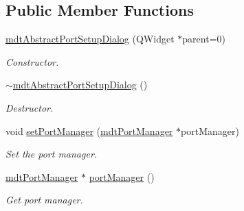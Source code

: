 \subsection*{Public Member Functions}
\begin{DoxyCompactItemize}
\item 
\hypertarget{classmdt_abstract_port_setup_dialog_a3f62d7eb0c8bdc3bbc7874b975ee7fd2}{
\hyperlink{classmdt_abstract_port_setup_dialog_a3f62d7eb0c8bdc3bbc7874b975ee7fd2}{mdtAbstractPortSetupDialog} (QWidget $\ast$parent=0)}
\label{classmdt_abstract_port_setup_dialog_a3f62d7eb0c8bdc3bbc7874b975ee7fd2}

\begin{DoxyCompactList}\small\item\em Constructor. \end{DoxyCompactList}\item 
\hypertarget{classmdt_abstract_port_setup_dialog_ad4df603a6fa5277757cdceef2bf9e4df}{
\hyperlink{classmdt_abstract_port_setup_dialog_ad4df603a6fa5277757cdceef2bf9e4df}{$\sim$mdtAbstractPortSetupDialog} ()}
\label{classmdt_abstract_port_setup_dialog_ad4df603a6fa5277757cdceef2bf9e4df}

\begin{DoxyCompactList}\small\item\em Destructor. \end{DoxyCompactList}\item 
void \hyperlink{classmdt_abstract_port_setup_dialog_a016ab988e47c7702a9400985eb95fbc5}{setPortManager} (\hyperlink{classmdt_port_manager}{mdtPortManager} $\ast$portManager)
\begin{DoxyCompactList}\small\item\em Set the port manager. \end{DoxyCompactList}\item 
\hyperlink{classmdt_port_manager}{mdtPortManager} $\ast$ \hyperlink{classmdt_abstract_port_setup_dialog_a4aeeb47c43174bfa005e51100b767c13}{portManager} ()
\begin{DoxyCompactList}\small\item\em Get port manager. \end{DoxyCompactList}\end{DoxyCompactItemize}
